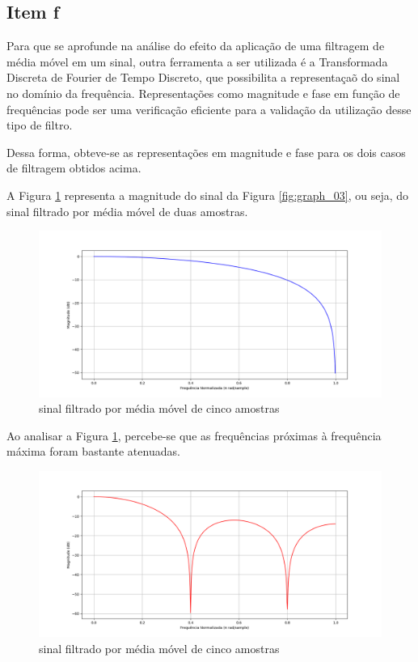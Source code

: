 \subsection{Item f}
Para que se aprofunde na análise do efeito da aplicação de uma filtragem de média móvel em um sinal, outra ferramenta a ser utilizada é a Transformada Discreta de Fourier de Tempo Discreto, que possibilita a representaçaõ do sinal no domínio da frequência. Representações como magnitude e fase em função de frequências pode ser uma verificação eficiente para a validação da utilização desse tipo de filtro.

Dessa forma, obteve-se as representações em magnitude e fase para os dois casos de filtragem obtidos acima.

A Figura \ref{fig:graph_05} representa a magnitude do sinal da Figura \ref{fig:graph_03}, ou seja, do sinal filtrado por média móvel de duas amostras. 

\begin{figure}[!htb]
    \centering
    \includegraphics[width=\linewidth]{Imagens/fig05.png}
    \caption{sinal filtrado por média móvel de cinco amostras}
    \label{fig:graph_05}
\end{figure}

Ao analisar a Figura \ref{fig:graph_05}, percebe-se que as frequências próximas à frequência máxima foram bastante atenuadas.

\begin{figure}[!htb]
    \centering
    \includegraphics[width=\linewidth]{Imagens/fig06.png}
    \caption{sinal filtrado por média móvel de cinco amostras}
    \label{fig:graph_06}
\end{figure}

